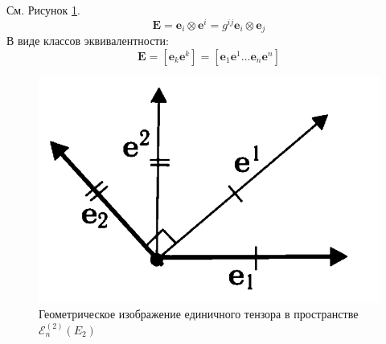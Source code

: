 \begin{definition}
	См. Рисунок \ref{fig:que33}.
	\begin{equation*}
		\mathbf{E} = \mathbf{e}_i\otimes\mathbf{e}^i = g^{ij}\mathbf{e}_i\otimes\mathbf{e}_j
	\end{equation*}
	В виде классов эквивалентности:
	\begin{equation*}
		\mathbf{E}=\left[\mathbf{e}_k\mathbf{e}^k\right]=\left[\mathbf{e}_1\mathbf{e}^1\dots\mathbf{e}_n\mathbf{e}^n\right]
	\end{equation*}
\end{definition}
\begin{figure}[H]
	\centering
	\includegraphics[width=0.4\linewidth]{img/que3_3}
	\caption{Геометрическое изображение единичного тензора в пространстве $\mathcal{E}_n^{(2)}\left(E_2\right)$}
	\label{fig:que33}
\end{figure}

